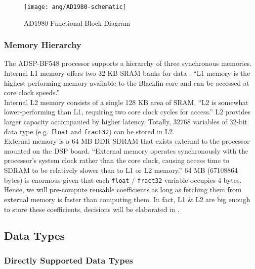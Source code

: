 \begin{figure}[H]
\centering
\texttt{[image: ang/AD1980-schematic]}
\caption{AD1980 Functional Block Diagram}
\label{AD1980-schematic}
\end{figure}


\subsubsection{Memory Hierarchy}
The ADSP-BF548 processor supports a hierarchy of three synchronous memories.\\

Internal L1 memory offers two 32 KB SRAM banks for data \cite{bf54x-hardware}. ``L1 memory is the highest-performing memory available to the Blackfin core and can be accessed at core clock speeds.''\cite{start-with-bf548}\\

Internal L2 memory consists of a single 128 KB area of SRAM. ``L2 is somewhat lower-performing than L1, requiring two core clock cycles for access.'' L2 provides larger capacity accompanied by higher latency. \cite{start-with-bf548} Totally, 32768 variables of 32-bit data type (e.g. \texttt{float} and \texttt{fract32}) can be stored in L2.\\

External memory is a 64 MB DDR SDRAM that exists external to the processor mounted on the DSP board. ``External memory operates synchronously with the processor's system clock rather than the core clock, causing access time to SDRAM to be relatively slower than to L1 or L2 memory.''\cite{start-with-bf548} 64 MB (67108864 bytes) is enormous given that each \texttt{float} / \texttt{fract32} variable occupies 4 bytes. Hence, we will pre-compute reusable coefficients as long as fetching them from external memory is faster than computing them. In fact, L1 \& L2 are big enough to store these coefficients, decisions will be elaborated in .


\subsection{Data Types}

\subsubsection{Directly Supported Data Types}

